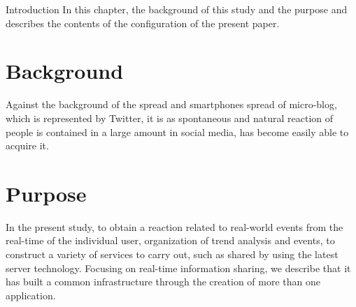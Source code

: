 \chapterhead
{Introduction}
{In this chapter, the background of this study and the purpose and describes the contents of the configuration of the present paper.}


\section{Background}
Against the background of the spread and smartphones spread of micro-blog, which is represented by Twitter, it is as spontaneous and natural reaction of people is contained in a large amount in social media, has become easily able to acquire it.




\section{Purpose}
In the present study, to obtain a reaction related to real-world events from the real-time of the individual user, organization of trend analysis and events, to construct a variety of services to carry out, such as shared by using the latest server technology. Focusing on real-time information sharing, we describe that it has built a common infrastructure through the creation of more than one application.


